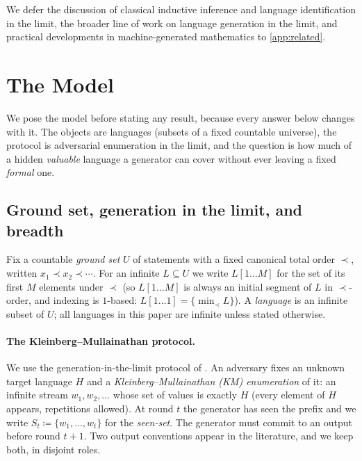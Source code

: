 \documentclass[11pt]{article}
\numberwithin{equation}{section}
\newcommand{\defeq}{\coloneqq}
\newcommand{\gnd}{U}
\newcommand{\Val}{H}
\newcommand{\Seen}{S}
\newcommand{\rest}[2]{#1[1\!\dots\! #2]}
\theoremstyle{plain}
\theoremstyle{definition}
\theoremstyle{remark}
\begin{document}
\vspace{2mm}
We defer the discussion of classical inductive inference and language identification in the
limit, the broader line of work on language generation in the limit, and practical
developments in machine-generated mathematics to \cref{app:related}.


\section{The Model}
\label{sec:prelim}

We pose the model before stating any result, because every answer below changes with it. The
objects are languages (subsets of a fixed countable universe), the protocol is adversarial
enumeration in the limit, and the question is how much of a hidden \emph{valuable} language a
generator can cover without ever leaving a fixed \emph{formal} one.

\subsection{Ground set, generation in the limit, and breadth}
\label{sec:prelim-km}

Fix a countable \emph{ground set} $\gnd$ of statements with a fixed canonical total order
$\prec$, written $x_1 \prec x_2 \prec \cdots$. For an infinite $L \subseteq \gnd$ we write
$\rest{L}{M}$ for the set of its first $M$ elements under $\prec$ (so $\rest{L}{M}$ is always
an initial segment of $L$ in $\prec$-order, and indexing is $1$-based: $\rest{L}{1} =
\{\min_\prec L\}$). A \emph{language} is an infinite subset of $\gnd$; all languages in this
paper are infinite unless stated otherwise.

\paragraph{The Kleinberg--Mullainathan protocol.}
We use the generation-in-the-limit protocol of \citet{kleinberg2024language}. An adversary
fixes an unknown target language $\Val$ and a \emph{Kleinberg--Mullainathan (KM) enumeration}
of it: an infinite stream $w_1, w_2, \dots$ whose set of values is exactly $\Val$ (every
element of $\Val$ appears, repetitions allowed). At round $t$ the generator has seen the
prefix and we write $\Seen_t \defeq \{w_1, \dots, w_t\}$ for the \emph{seen-set}. The
generator must commit to an output before round $t+1$. Two output conventions appear in the
literature, and we keep both, in disjoint roles.
\end{document}
